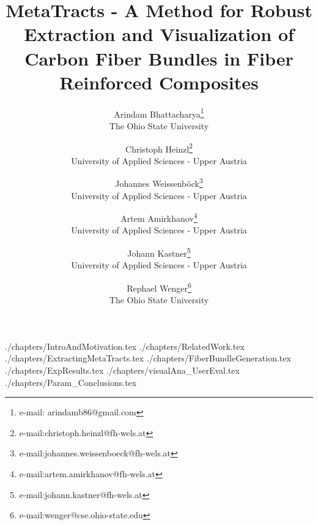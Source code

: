 \documentclass[journal]{vgtc}                %
\title{MetaTracts - A Method for Robust Extraction and Visualization of Carbon Fiber Bundles in Fiber Reinforced Composites}
\author{Arindam Bhattacharya\thanks{e-mail: arindamb86@gmail.com}\\ %
	\scriptsize The Ohio State University %
	\and Christoph Heinzl\thanks{e-mail:christoph.heinzl@fh-wels.at}\\ %
	\scriptsize University of Applied Sciences - Upper Austria%
	\and Johannes Weissenb{\"o}ck\thanks{e-mail:johannes.weissenboeck@fh-wels.at}\\ %
	\scriptsize University of Applied Sciences - Upper Austria%
	\and Artem Amirkhanov\thanks{e-mail:artem.amirkhanov@fh-wels.at}\\ %
	\scriptsize University of Applied Sciences - Upper Austria%
	\and Johann Kastner\thanks{e-mail:johann.kastner@fh-wels.at}\\ %
	\scriptsize University of Applied Sciences - Upper Austria%
	\and Rephael Wenger\thanks{e-mail:wenger@cse.ohio-state.edu}\\ %
	\scriptsize The Ohio State University
}
\begin{document}


\maketitle
 {./chapters/IntroAndMotivation.tex}
 {./chapters/RelatedWork.tex}
 {./chapters/ExtractingMetaTracts.tex}
 {./chapters/FiberBundleGeneration.tex}
 {./chapters/ExpResults.tex}
 {./chapters/visualAna_UserEval.tex}
 {./chapters/Param_Conclusions.tex}


\end{document}
